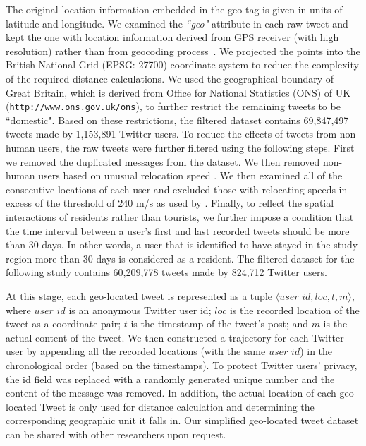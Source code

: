 \documentclass[]{tGIS2e}
\begin{document}
The original location information embedded in the geo-tag is given in units of latitude and longitude.
We examined the \textit{``geo"} attribute in each raw tweet and kept the one with location information derived from GPS receiver (with high resolution) rather than from geocoding process~\citep{jurdak2015}.
We projected the points into the British National Grid (EPSG: 27700) coordinate system to reduce the complexity of the required distance calculations. 
We used the geographical boundary of Great Britain, which is derived from Office for National Statistics (ONS) of UK ({\tt{http://www.ons.gov.uk/ons}}), to further restrict the remaining tweets to be ``domestic".
Based on these restrictions, the filtered dataset contains 69,847,497 tweets made by 1,153,891 Twitter users.
To reduce the effects of tweets from non-human users, the raw tweets were further filtered using the following steps.
First we removed the duplicated messages from the dataset.
We then removed non-human users based on unusual relocation speed \citep{hawelka,jurdak2015}. 
We then examined all of the consecutive locations of each user and excluded those with relocating speeds in excess of the threshold of 240 m/s as used by \citep{jurdak2015}.
Finally, to reflect the spatial interactions of residents rather than tourists, we further impose a condition that the time interval between a user's first and last recorded tweets should be more than 30 days.
In other words, a user that is identified to have stayed in the study region more than 30 days is considered as a resident.
The filtered dataset for the following study contains 60,209,778 tweets made by 824,712 Twitter users.

At this stage, each geo-located tweet is represented as a tuple $\langle user\_id, loc, t, m \rangle$, where $user\_id$ is an anonymous Twitter user id; $loc$ is the recorded location of the tweet as a coordinate pair; $t$ is the timestamp of the tweet's post; and $m$ is the actual content of the tweet. 
We then constructed a trajectory for each Twitter user by appending all the recorded locations (with the same  $user\_id$) in the chronological order (based on the timestamps).
To protect Twitter users’ privacy, the id field was replaced with a randomly generated unique number and the content of the message was removed.
In addition, the actual location of each geo-located Tweet is only used for distance calculation and determining the corresponding geographic unit it falls in. 
Our simplified geo-located tweet dataset can be shared with other researchers upon request.
\end{document}
